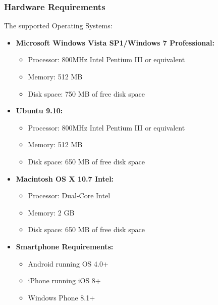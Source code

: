 \documentclass[11 pt]{article}
\begin{document}
\subsubsection{Hardware Requirements}
The supported Operating Systems:
\begin{itemize}

\item
\textbf{Microsoft Windows Vista SP1/Windows 7 Professional:}
\begin{itemize}
\item
Processor: 800MHz Intel Pentium III or equivalent
\item
Memory: 512 MB
\item
Disk space: 750 MB of free disk space
\end{itemize}
\item
\textbf{Ubuntu 9.10:}
\begin{itemize}
\item
Processor: 800MHz Intel Pentium III or equivalent
\item
Memory: 512 MB
\item
Disk space: 650 MB of free disk space
\end{itemize}
\item
\textbf{Macintosh OS X 10.7 Intel:}
\begin{itemize}
\item
Processor: Dual-Core Intel
\item
Memory: 2 GB
\item
Disk space: 650 MB of free disk space
\end{itemize}
\item
\textbf{Smartphone Requirements:}
\begin{itemize}

\item
Android running OS 4.0+
\item
iPhone running iOS 8+
\item
Windows Phone 8.1+
\end{itemize}
\end{itemize}
\end{document}
